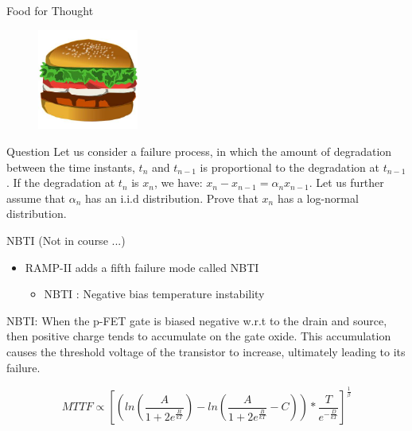 \documentclass[xcolor=pdftex,dvipsnames,table,svgnames,x11names]{beamer}
\begin{document}
\begin{frame}{Food for Thought}
\begin{center}
\vspace{-9mm}
 \begin{figure}[h]
    \includegraphics[width=1.3in]{burger}
 \end{figure}
\vspace{-7mm}
\end{center}
  \begin{block}{Question}
    Let us consider a failure process, in which the amount of degradation between the time instants, $t_n$ and $t_{n-1}$
    is proportional to the degradation at $t_{n-1}$. If the degradation at $t_n$ is $x_n$, we have: $x_n - x_{n-1} = \alpha_n x_{n-1}$. 	
    Let us further assume that $\alpha_n$ has an i.i.d distribution. Prove that $x_n$ has a log-normal distribution.
  \end{block}
\end{frame}

\begin{frame}{NBTI (Not in course ...)}
\begin{itemize}
 \item RAMP-II adds a fifth failure mode called \textcolor{Blue3}{NBTI}
    \begin{itemize}
      \item NBTI : Negative bias temperature instability
    \end{itemize}
\end{itemize}
\begin{definition}{NBTI: }
 When the p-FET gate is biased negative w.r.t to the drain and source, then positive charge tends to accumulate on the
	  gate oxide. This accumulation causes the threshold voltage of the transistor to increase, ultimately leading to its
	  failure.
\end{definition}
\begin{equation*}
 MTTF \propto \left [ \left (ln \left (\frac{A}{1 + 2e^{\frac{B}{kT}}} \right ) -  ln \left (
	  \frac{A}{1 + 2e^{\frac{B}{kT}}} -C \right ) \right) * \frac{T}{e^{-\frac{D}{kT}}}\right ]^{\frac{1}{\beta}}
\end{equation*}
\end{frame}
\end{document}
